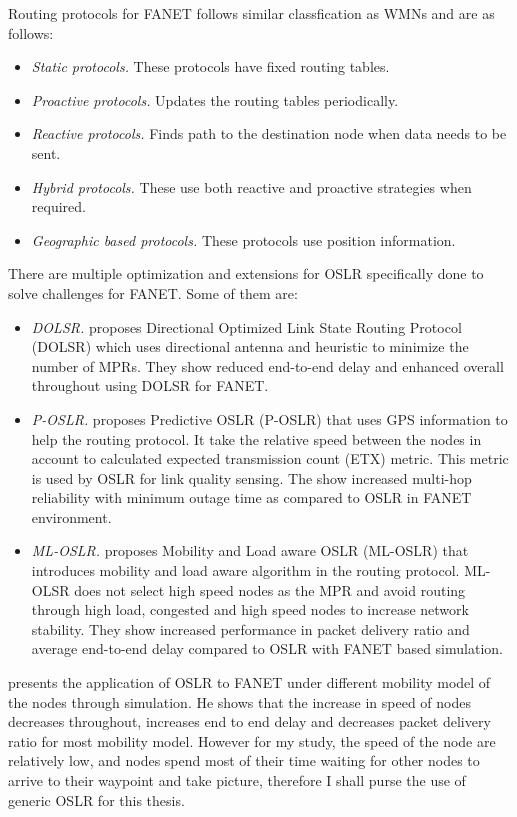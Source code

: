 Routing protocols for FANET follows similar classfication as WMNs and are as follows:

\begin{itemize} 
	\item \textit{Static protocols.} These protocols have fixed routing tables.
	\item \textit{Proactive protocols.} Updates the routing tables periodically.
	\item \textit{Reactive protocols.} Finds path to the destination node when data needs to be sent.
	\item \textit{Hybrid protocols.}  These use both reactive and proactive strategies when required. 
	\item \textit{Geographic based protocols.} These protocols use position information.
\end{itemize}

There are multiple optimization and extensions for OSLR specifically done to solve challenges for FANET. Some of them are:

\begin{itemize}
	\item \textit{DOLSR.}  proposes Directional Optimized Link State Routing Protocol (DOLSR) which uses directional antenna and heuristic to minimize the number of MPRs. They show reduced end-to-end delay and enhanced overall throughout using DOLSR for FANET.
	\item \textit{P-OSLR.}  proposes Predictive OSLR (P-OSLR) that uses GPS information to help the routing protocol. It take the relative speed between the nodes in account to calculated expected transmission count (ETX) metric. This metric is used by OSLR for link quality sensing. The show increased multi-hop reliability with minimum outage time as compared to OSLR in FANET environment.
	\item \textit{ML-OSLR.}  proposes Mobility and Load aware OSLR (ML-OSLR) that introduces mobility and load aware algorithm in the routing protocol. ML-OLSR does not select high speed nodes as the MPR and avoid routing through high load, congested and high speed nodes to increase network stability. They show increased performance in packet delivery ratio and average end-to-end delay compared to OSLR with FANET based simulation.
\end{itemize}

 presents the application of OSLR to FANET under different mobility model of the nodes through simulation. He shows that the increase in speed of nodes decreases throughout, increases end to end delay and decreases packet delivery ratio for most mobility model. However for my study, the speed of the node are relatively low, and nodes spend most of their time waiting for other nodes to arrive to their waypoint and take picture, therefore I shall purse the use of generic OSLR for this thesis.


